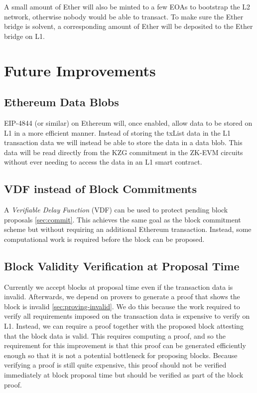\documentclass[9pt,oneside]{amsart}
\begin{document}
\begin{multicols}{2}
A small amount of Ether will also be minted to a few EOAs to bootstrap the L2 network, otherwise nobody would be able to transact. To make sure the Ether bridge is solvent, a corresponding amount of Ether will be deposited to the Ether bridge on L1.

\section{Future Improvements}\label{sec:improvements}

\subsection{Ethereum Data Blobs}\label{sec:datablobs}
EIP-4844 \cite{eip4844} (or similar) on Ethereum will, once enabled, allow data to be stored on L1 in a more efficient manner. Instead of storing the txList data in the L1 transaction data we will instead be able to store the data in a data blob. This data will be read directly from the KZG commitment in the ZK-EVM circuits without ever needing to access the data in an L1 smart contract.

\subsection{VDF instead of Block Commitments}\label{sec:vdf}
A \emph{Verifiable Delay Function} (VDF) can be used to protect pending block proposals \ref{sec:commit}. This achieves the same goal as the block commitment scheme but without requiring an additional Ethereum transaction. Instead, some computational work is required before the block can be proposed.

\subsection{Block Validity Verification at Proposal Time}\label{sec:propose-proof}
Currently we accept blocks at proposal time even if the transaction data is invalid. Afterwards, we depend on provers to generate a proof that shows the block is invalid \ref{sec:proving-invalid}. We do this because the work required to verify all requirements imposed on the transaction data is expensive to verify on L1. Instead, we can require a proof together with the proposed block attesting that the block data is valid. This requires computing a proof, and so the requirement for this improvement is that this proof can be generated efficiently enough so that it is not a potential bottleneck for proposing blocks. Because verifying a proof is still quite expensive, this proof should not be verified immediately at block proposal time but should be verified as part of the block proof.


\end{multicols}
\end{document}
